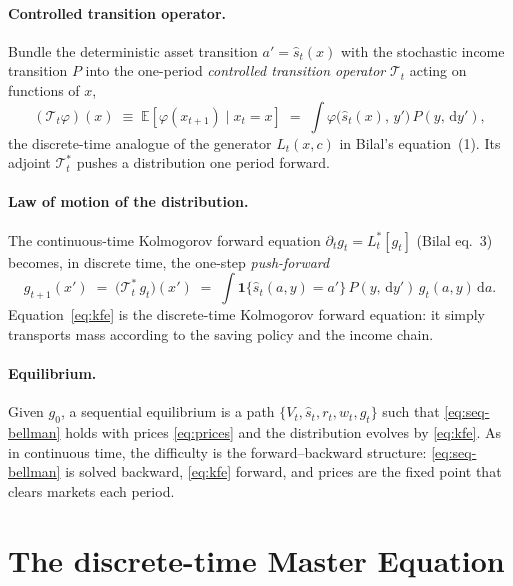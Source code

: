 \documentclass[11pt]{article}
\newcommand{\E}{\mathbb{E}}
\newcommand{\Tr}{\mathcal{T}}
\newcommand{\Tstar}{\mathcal{T}^{*}}
\newcommand{\dd}{\,\mathrm{d}}
\begin{document}
\paragraph{Controlled transition operator.}
Bundle the deterministic asset transition $a'=\hat s_t(x)$ with the stochastic
income transition $P$ into the one-period \emph{controlled transition operator}
$\Tr_t$ acting on functions of $x$,
\begin{equation}\label{eq:Top}
  (\Tr_t\varphi)(x)\;\equiv\;\E\!\left[\varphi(x_{t+1})\mid x_t=x\right]
  \;=\;\int \varphi\big(\hat s_t(x),\,y'\big)\,P(y,\dd y'),
\end{equation}
the discrete-time analogue of the generator $L_t(x,c)$ in Bilal's equation~(1).
Its adjoint $\Tstar_t$ pushes a distribution one period forward.

\paragraph{Law of motion of the distribution.}
The continuous-time Kolmogorov forward equation
$\partial_t g_t=L_t^{*}[g_t]$ (Bilal eq.~3) becomes, in discrete time, the
one-step \emph{push-forward}
\begin{equation}\label{eq:kfe}
  g_{t+1}(x') \;=\; \big(\Tstar_t\,g_t\big)(x')
  \;=\; \int \mathbf 1\{\hat s_t(a,y)=a'\}\,P(y,\dd y')\,g_t(a,y)\dd a .
\end{equation}
Equation~\eqref{eq:kfe} is the discrete-time Kolmogorov forward equation: it simply
transports mass according to the saving policy and the income chain.

\paragraph{Equilibrium.} Given $g_0$, a sequential equilibrium is a path
$\{V_t,\hat s_t,r_t,w_t,g_t\}$ such that \eqref{eq:seq-bellman} holds with prices
\eqref{eq:prices} and the distribution evolves by \eqref{eq:kfe}. As in continuous
time, the difficulty is the forward--backward structure: \eqref{eq:seq-bellman} is
solved backward, \eqref{eq:kfe} forward, and prices are the fixed point that clears
markets each period.

\section{The discrete-time Master Equation}
\end{document}

